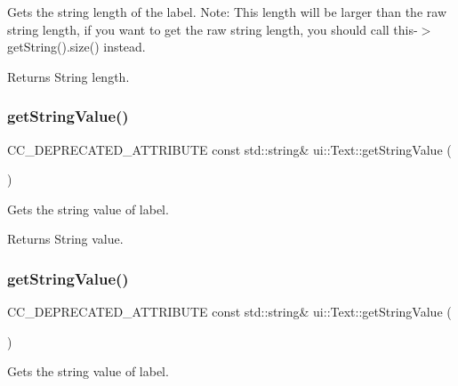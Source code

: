 Gets the string length of the label. Note\+: This length will be larger than the raw string length, if you want to get the raw string length, you should call this-\/$>$get\+String().size() instead.

\begin{DoxyReturn}{Returns}
String length. 
\end{DoxyReturn}
\mbox{\label{classui_1_1Text_af96f13417b0e3369f241917a6ea52b9e}} 
\subsubsection{\texorpdfstring{get\+String\+Value()}{getStringValue()}\hspace{0.1cm}{\footnotesize\ttfamily [1/2]}}
{\footnotesize\ttfamily C\+C\+\_\+\+D\+E\+P\+R\+E\+C\+A\+T\+E\+D\+\_\+\+A\+T\+T\+R\+I\+B\+U\+TE const std\+::string\& ui\+::\+Text\+::get\+String\+Value (\begin{DoxyParamCaption}{ }\end{DoxyParamCaption})\hspace{0.3cm}{\ttfamily [inline]}}

Gets the string value of label.

\begin{DoxyReturn}{Returns}
String value. 
\end{DoxyReturn}
\mbox{\label{classui_1_1Text_af96f13417b0e3369f241917a6ea52b9e}} 
\subsubsection{\texorpdfstring{get\+String\+Value()}{getStringValue()}\hspace{0.1cm}{\footnotesize\ttfamily [2/2]}}
{\footnotesize\ttfamily C\+C\+\_\+\+D\+E\+P\+R\+E\+C\+A\+T\+E\+D\+\_\+\+A\+T\+T\+R\+I\+B\+U\+TE const std\+::string\& ui\+::\+Text\+::get\+String\+Value (\begin{DoxyParamCaption}{ }\end{DoxyParamCaption})\hspace{0.3cm}{\ttfamily [inline]}}

Gets the string value of label.


